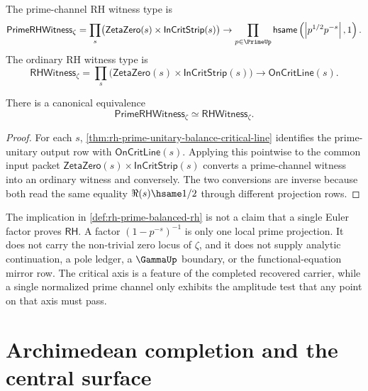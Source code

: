 \begin{definition}
\label{def:rh-prime-channel-witness}
The prime-channel RH witness type is
$$
\mathsf{PrimeRHWitness}_{\zeta}
=
\prod_s
\bigl(
\mathsf{ZetaZero}(s)\times\mathsf{InCritStrip}(s)
\bigr)
\to
\prod_{p\in\PrimeUp}
\mathsf{hsame}
\left(
\left|p^{1/2}p^{-s}\right|,
1
\right).
$$
The ordinary RH witness type is
$$
\mathsf{RHWitness}_{\zeta}
=
\prod_s
\bigl(
\mathsf{ZetaZero}(s)\times\mathsf{InCritStrip}(s)
\bigr)
\to
\mathsf{OnCritLine}(s).
$$
\end{definition}

\begin{proposition}
\label{prop:rh-prime-witness-equivalent}
There is a canonical equivalence
$$
\mathsf{PrimeRHWitness}_{\zeta}
\simeq
\mathsf{RHWitness}_{\zeta}.
$$
\end{proposition}

\begin{proof}
For each $s$, \autoref{thm:rh-prime-unitary-balance-critical-line} identifies
the prime-unitary output row with $\mathsf{OnCritLine}(s)$.  Applying this
pointwise to the common input packet
$\mathsf{ZetaZero}(s)\times\mathsf{InCritStrip}(s)$ converts a
prime-channel witness into an ordinary witness and conversely.  The two
conversions are inverse because both read the same equality
$\Re(s)\hsame 1/2$ through different projection rows.
\end{proof}

\begin{remark}
\label{rem:rh-prime-balance-not-euler-factor-proof}
The implication in \autoref{def:rh-prime-balanced-rh} is not a claim that a
single Euler factor proves $\mathsf{RH}$.  A factor
$(1-p^{-s})^{-1}$ is only one local prime projection.  It does not carry the
non-trivial zero locus of $\zeta$, and it does not supply analytic
continuation, a pole ledger, a $\GammaUp$ boundary, or the
functional-equation mirror row.  The critical axis is a feature of the
completed recovered carrier, while a single normalized prime channel only
exhibits the amplitude test that any point on that axis must pass.
\end{remark}

\section{Archimedean completion and the central surface}
\label{sec:rh-archimedean-completion-central-surface}

